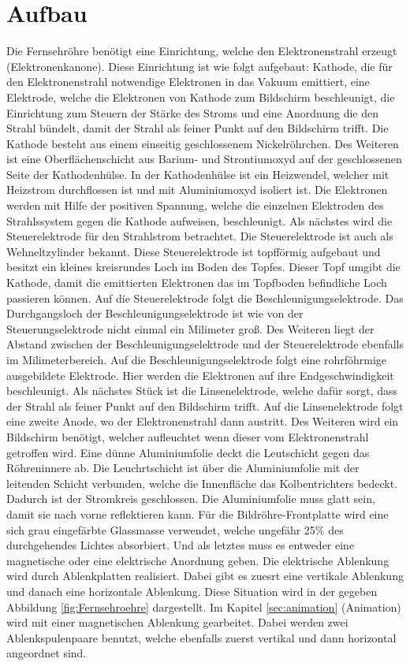\section{Aufbau}
Die Fernsehröhre benötigt eine Einrichtung, welche den Elektronenstrahl erzeugt (Elektronenkanone).
Diese Einrichtung ist wie folgt aufgebaut: Kathode, die für den Elektronenstrahl notwendige Elektronen in das Vakuum emittiert, eine Elektrode, welche die Elektronen von Kathode zum Bildschirm beschleunigt, die Einrichtung zum Steuern der Stärke des Stroms und eine Anordnung die den Strahl bündelt, damit der Strahl als feiner Punkt auf den Bildschirm trifft. 
Die Kathode besteht aus einem einseitig geschlossenem Nickelröhrchen.
Des Weiteren ist eine Oberflächenschicht aus Barium- und Strontiumoxyd auf der geschlossenen Seite der Kathodenhülse.
In der Kathodenhülse ist ein Heizwendel, welcher mit Heizstrom durchflossen ist und mit Aluminiumoxyd isoliert ist.
Die Elektronen werden mit Hilfe der positiven Spannung, welche die einzelnen Elektroden des Strahlssystem gegen die Kathode aufweisen, beschleunigt.
Als nächstes wird die Steuerelektrode für den Strahlstrom betrachtet.
Die Steuerelektrode ist auch als Wehneltzylinder bekannt.
Diese Steuerelektrode ist topfförmig aufgebaut und besitzt ein kleines kreisrundes Loch im Boden des Topfes.
Dieser Topf umgibt die Kathode, damit die emittierten Elektronen das im Topfboden befindliche Loch passieren können.
Auf die Steuerelektrode folgt die Beschleunigungselektrode.
Das Durchgangsloch der Beschleunigungselektrode ist wie von der Steuerungselektrode nicht einmal ein Milimeter groß.
Des Weiteren liegt der Abstand zwischen der Beschleunigungselektrode und der Steuerelektrode ebenfalls im Milimeterbereich.
Auf die Beschleunigungselektrode folgt eine rohrföhrmige ausgebildete Elektrode.
Hier werden die Elektronen auf ihre Endgeschwindigkeit beschleunigt.
Als nächstes Stück ist die Linsenelektrode, welche dafür sorgt, dass der Strahl als feiner Punkt auf den Bildschirm trifft.
Auf die Linsenelektrode folgt eine zweite Anode, wo der Elektronenstrahl dann austritt.
Des Weiteren wird ein Bildschirm benötigt, welcher aufleuchtet wenn dieser vom Elektronenstrahl getroffen wird.
Eine dünne Aluminiumfolie deckt die Leutschicht gegen das Röhreninnere ab.
Die Leuchrtschicht ist über die Aluminiumfolie mit der leitenden Schicht verbunden, welche die Innenfläche das Kolbentrichters bedeckt.
Dadurch ist der Stromkreis geschlossen.
Die Aluminiumfolie muss glatt sein, damit sie nach vorne reflektieren kann.
Für die Bildröhre-Frontplatte wird eine sich grau eingefärbte Glassmasse verwendet, welche ungefähr 25\% des durchgehendes Lichtes absorbiert.
Und als letztes muss es entweder eine magnetische oder eine elektrische Anordnung geben.
Die elektrische Ablenkung wird durch Ablenkplatten realisiert.
Dabei gibt es zuesrt eine vertikale Ablenkung und danach eine horizontale Ablenkung.
Diese Situation wird in der gegeben Abbildung \ref{fig:Fernsehroehre} dargestellt.
Im Kapitel \ref{sec:animation} (Animation) wird mit einer magnetischen Ablenkung gearbeitet.
Dabei werden zwei Ablenkspulenpaare benutzt, welche ebenfalls zuerst vertikal und dann horizontal angeordnet sind.

